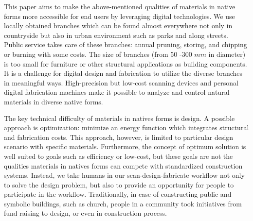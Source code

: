 This paper aims to make the above-mentioned qualities of materials in native forms more accessible for end users by leveraging digital technologies.
We use locally obtained branches which can be found almost everywhere not only in countryside but also in urban environment such as parks and along streets.
Public service takes care of these branches: annual pruning, storing, and chipping or burning with some costs.
The size of branches (from 50 -300 $mm$ in diameter) is too small for furniture or other structural applications as building components.
It is a challenge for digital design and fabrication to utilize the diverse branches in meaningful ways.
High-precision but low-cost scanning devices and personal digital fabrication machines make it possible to analyze and control natural materials in diverse native forms.

The key technical difficulty of materials in natives forms is design.
A possible approach is optimization: minimize an energy function which integrates structural and fabrication costs.
This approach, however, is limited to particular design scenario with specific materials.
Furthermore, the concept of optimum solution is well suited to goals such as efficiency or low-cost, but these goals are not the qualities materials in natives forms can compete with standardized construction systems.
Instead, we take humans in our scan-design-fabricate workflow not only to solve the design problem, but also to provide an opportunity for people to participate in the workflow.
Traditionally, in case of constructing public and symbolic buildings, such as church, people in a community took initiatives from fund raising to design, or even in construction process.




